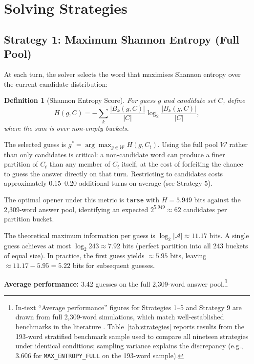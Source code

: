 \documentclass{article}
\newtheorem{definition}{Definition}
\begin{document}
\section{Solving Strategies}
\label{sec:strategies}

\subsection{Strategy 1: Maximum Shannon Entropy (Full Pool)}

At each turn, the solver selects the word that maximises Shannon entropy
\citep{shannon1948mathematical} over the current candidate distribution:

\begin{definition}[Shannon Entropy Score]
  For guess $g$ and candidate set $C$, define
  \[
    H(g, C) = -\sum_{k} \frac{|B_k(g,C)|}{|C|} \log_2 \frac{|B_k(g,C)|}{|C|},
  \]
  where the sum is over non-empty buckets.
\end{definition}

The selected guess is $g^* = \arg\max_{g \in \mathcal{W}} H(g, C_t)$.
Using the full pool $\mathcal{W}$ rather than only candidates is critical:
a non-candidate word can produce a finer partition of $C_t$ than any member
of $C_t$ itself, at the cost of forfeiting the chance to guess the answer
directly on that turn. Restricting to candidates costs approximately
0.15--0.20 additional turns on average (see Strategy 5).

The optimal opener under this metric is \texttt{tarse} with $H = 5.949$ bits
against the 2,309-word answer pool, identifying an expected
$2^{5.949} \approx 62$ candidates per partition bucket.

The theoretical maximum information per guess is $\log_2 |\mathcal{A}| \approx 11.17$
bits. A single guess achieves at most $\log_2 243 \approx 7.92$ bits (perfect
partition into all 243 buckets of equal size). In practice, the first guess
yields $\approx 5.95$ bits, leaving $\approx 11.17 - 5.95 = 5.22$ bits for
subsequent guesses.

\textbf{Average performance:} 3.42 guesses on the full 2,309-word answer
pool.\footnote{In-text ``Average performance'' figures for Strategies 1--5
and Strategy 9 are drawn from full 2,309-word simulations, which match
well-established benchmarks in the literature \citep{bertsimas2025exact}.
Table~\ref{tab:strategies} reports results from the 193-word stratified
benchmark sample used to compare all nineteen strategies under identical
conditions; sampling variance explains the discrepancy (e.g., 3.606 for
\texttt{MAX\_ENTROPY\_FULL} on the 193-word sample).}
\end{document}
